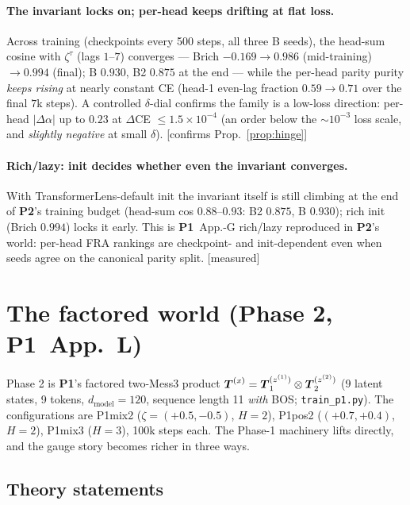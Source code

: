 \documentclass{article}
\newcommand{\htag}[1]{{\normalfont\sffamily\footnotesize[#1]}}
\newcommand{\Pone}{\textbf{P1}}
\newcommand{\Ptwo}{\textbf{P2}}
\begin{document}
\paragraph{The invariant locks on; per-head keeps drifting at flat loss.} Across
training (checkpoints every 500 steps, all three B seeds), the head-sum cosine with
$\zeta^\tau$ (lags $1$--$7$) converges --- Brich $-0.169\to0.986$ (mid-training)
$\to0.994$ (final); B $0.930$, B2 $0.875$ at the end --- while the per-head parity
purity \emph{keeps rising} at nearly constant CE (head-1 even-lag fraction
$0.59\to0.71$ over the final $7$k steps). A
controlled $\delta$-dial confirms the family is a low-loss direction: per-head
$|\Delta\alpha|$ up to $0.23$ at $\Delta$CE $\le1.5\times10^{-4}$ (an order below the
$\sim\!10^{-3}$ loss scale, and \emph{slightly negative} at small $\delta$).
\htag{confirms Prop.~\ref{prop:hinge}}

\paragraph{Rich/lazy: init decides whether even the invariant converges.} With
TransformerLens-default init the invariant itself is still climbing at the end of
\Ptwo's training budget (head-sum cos $0.88$--$0.93$: B2 $0.875$, B $0.930$); rich init
(Brich $0.994$) locks it early. This is
\Pone\ App.-G rich/lazy reproduced in \Ptwo's world: per-head FRA rankings are
checkpoint- and init-dependent even when seeds agree on the canonical parity split.
\htag{measured}

\section{The factored world (Phase 2, \Pone\ App.\ L)}\label{sec:factored}

Phase 2 is \Pone's factored two-Mess3 product
$\boldsymbol{T}^{(x)}=\boldsymbol{T}_1^{(z^{(1)})}\otimes\boldsymbol{T}_2^{(z^{(2)})}$ (9 latent states, 9 tokens,
$d_{\mathrm{model}}=120$, sequence length 11 \emph{with} BOS; \texttt{train\_p1.py}).
The configurations are P1mix2 ($\zeta=(+0.5,-0.5)$, $H=2$), P1pos2 ($(+0.7,+0.4)$,
$H=2$), P1mix3 ($H=3$), 100k steps each. The Phase-1 machinery lifts directly, and the
gauge story becomes richer in three ways.

\subsection{Theory statements}\label{sec:factoredtheory}
\end{document}

